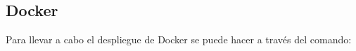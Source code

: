 \subsection{\label{sec:despliegue-docker}Docker}

Para llevar a cabo el despliegue de Docker se puede hacer a través del comando:

